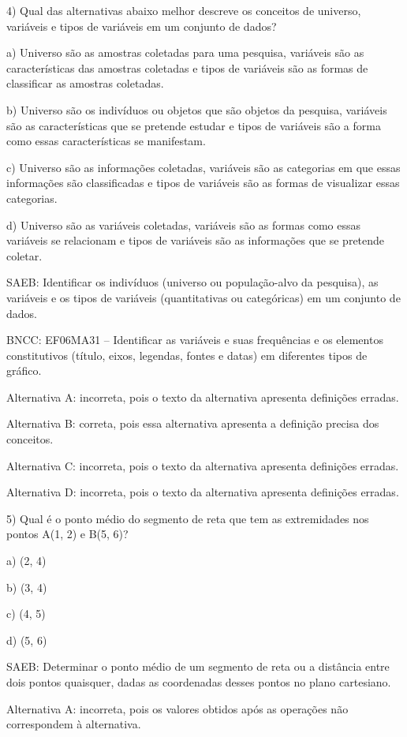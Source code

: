 4) Qual das alternativas abaixo melhor descreve os conceitos de
universo, variáveis e tipos de variáveis em um conjunto de dados?

a) Universo são as amostras coletadas para uma pesquisa, variáveis são
as características das amostras coletadas e tipos de variáveis são as
formas de classificar as amostras coletadas.

b) Universo são os indivíduos ou objetos que são objetos da pesquisa,
variáveis são as características que se pretende estudar e tipos de
variáveis são a forma como essas características se manifestam.

c) Universo são as informações coletadas, variáveis são as categorias em
que essas informações são classificadas e tipos de variáveis são as
formas de visualizar essas categorias.

d) Universo são as variáveis coletadas, variáveis são as formas como
essas variáveis se relacionam e tipos de variáveis são as informações
que se pretende coletar.

SAEB: Identificar os indivíduos (universo ou população-alvo da
pesquisa), as variáveis e os tipos de variáveis (quantitativas ou
categóricas) em um conjunto de dados.

BNCC: EF06MA31 -- Identificar as variáveis e suas frequências e os
elementos constitutivos (título, eixos, legendas, fontes e datas) em
diferentes tipos de gráfico.

Alternativa A: incorreta, pois o texto da alternativa apresenta
definições erradas.

Alternativa B: correta, pois essa alternativa apresenta a definição
precisa dos conceitos.

Alternativa C: incorreta, pois o texto da alternativa apresenta
definições erradas.

Alternativa D: incorreta, pois o texto da alternativa apresenta
definições erradas.

5) Qual é o ponto médio do segmento de reta que tem as extremidades nos
pontos A(1, 2) e B(5, 6)?

a) (2, 4)

b) (3, 4)

c) (4, 5)

d) (5, 6)

SAEB: Determinar o ponto médio de um segmento de reta ou a distância
entre dois pontos quaisquer, dadas as coordenadas desses pontos no plano
cartesiano.

Alternativa A: incorreta, pois os valores obtidos após as operações não
correspondem à alternativa.

